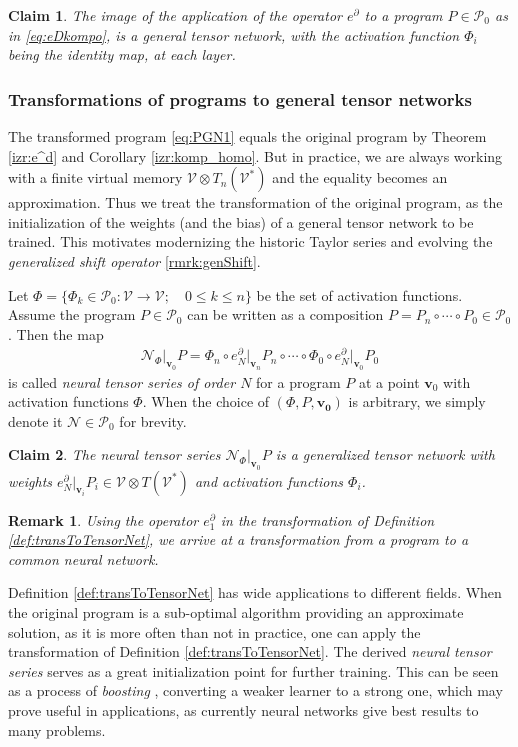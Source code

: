 \documentclass[smallcondensed]{svjour3}
\newcommand{\VV}{\mathcal{V}}
\newcommand{\NN}{\mathcal{N}}
\newcommand{\vv}{\mathbf{v}}
\newcommand{\dP}{\mathcal{P}}
\newcommand{\D}{\partial}
\newtheorem{trditev}{Claim}[section]
\newtheorem{opomba}{Remark}[section]
\begin{document}
\begin{trditev}
The image of the application of the operator $e^\D$ to a program $P\in\dP_0$ as in \eqref{eq:eDkompo}, is a general tensor network, with the activation function $\Phi_i$ being the identity map, at each layer.
\end{trditev}

\subsubsection{Transformations of programs to general tensor networks}\label{sec:transToNet}

The transformed program \eqref{eq:PGN1} equals the original program by Theorem \ref{izr:e^d} and Corollary \ref{izr:komp_homo}. But in practice, we are always working with a finite virtual memory $\VV\otimes T_n(\VV^*)$ and the equality becomes an approximation. Thus we treat the transformation of the original program, as the initialization of the weights (and the bias) of a general tensor network to be trained.  This motivates modernizing the historic Taylor series and evolving the \emph{generalized shift operator} \eqref{rmrk:genShift}.
\begin{definition}\label{def:transToTensorNet}
Let $\Phi=\{\Phi_k\in\dP_0:\VV\to\VV;\quad 0\le k\le n\}$ be the set of
activation functions. Assume the program $P\in\dP_0$ can be written as a
composition $P=P_n\circ\cdots\circ P_0\in\dP_0$. Then the map
\begin{eqnarray}
\mathcal{N}_\Phi\vert_{\mathbf{v}_0}P=\Phi_n\circ e^\D_N\vert_{\mathbf{v}_n}P_n\circ\cdots\circ\Phi_0\circ e^\D_N\vert_{\mathbf{v}_0}P_0
\end{eqnarray}
is called \emph{neural tensor series of order $N$} for a program $P$ at a point
$\vv_0$ with activation functions $\Phi$. When the choice of $(\Phi,P,\mathbf{v_0})$ is arbitrary, we simply denote it $\NN\in\dP_0$ for brevity.
\end{definition}


\begin{trditev}
The neural tensor series $\mathcal{N}_\Phi\vert_{\vv_0}P$ is a generalized
tensor network with weights $e^\D_N\vert_{\mathbf{v}_i}P_i\in\VV\otimes T(\VV^*)$ and activation
functions $\Phi_i$.
\end{trditev}


\begin{opomba}
Using the operator $e^ \D_1$ in the transformation of Definition \ref{def:transToTensorNet}, we arrive at a transformation from a program to a common neural network.
\end{opomba}
Definition \ref{def:transToTensorNet} has wide applications to different fields.
When the original program is a sub-optimal algorithm providing an approximate
solution, as it is more often than not in practice, one can apply the
transformation of Definition \ref{def:transToTensorNet}. The derived
\emph{neural tensor series} serves as a great initialization point for further
training. This can be seen as a process of \emph{boosting} \cite{boosting},
converting a weaker learner to a strong one, which may prove useful in
applications, as currently neural networks give best results to many problems.
\end{document}
